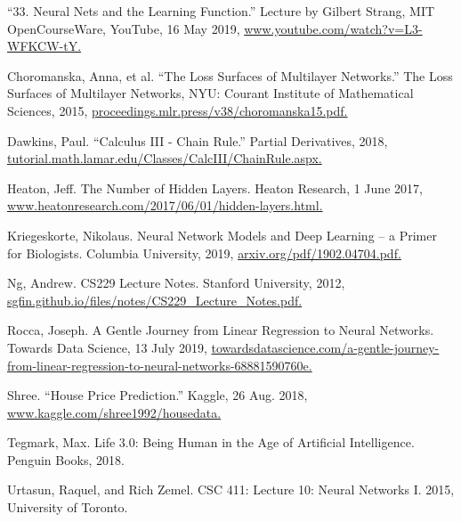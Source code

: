 \documentclass[12pt,a4paper]{article}
\begin{document}
\newpage

\begin{thebibliography}{99}


 “33. Neural Nets and the Learning Function.” Lecture by Gilbert Strang, MIT OpenCourseWare, YouTube, 16 May 2019,  \url{www.youtube.com/watch?v=L3-WFKCW-tY.}



 Choromanska, Anna, et al. “The Loss Surfaces of Multilayer Networks.” The Loss Surfaces of Multilayer Networks, NYU: Courant Institute of Mathematical Sciences, 2015,  \url{proceedings.mlr.press/v38/choromanska15.pdf.}



 Dawkins, Paul. “Calculus III - Chain Rule.” Partial Derivatives, 2018,  \url{tutorial.math.lamar.edu/Classes/CalcIII/ChainRule.aspx.}



 Heaton, Jeff. The Number of Hidden Layers. Heaton Research, 1 June 2017,  \url{www.heatonresearch.com/2017/06/01/hidden-layers.html.}



 Kriegeskorte, Nikolaus. Neural Network Models and Deep Learning – a Primer for Biologists. Columbia University, 2019,  \url{arxiv.org/pdf/1902.04704.pdf.}




 Ng, Andrew. CS229 Lecture Notes. Stanford University, 2012, \url{ sgfin.github.io/files/notes/CS229_Lecture_Notes.pdf.}



 Rocca, Joseph. A Gentle Journey from Linear Regression to Neural Networks. Towards Data Science, 13 July 2019, \url{ towardsdatascience.com/a-gentle-journey-from-linear-regression-to-neural-networks-68881590760e.}



 Shree. “House Price Prediction.” Kaggle, 26 Aug. 2018,  \url{www.kaggle.com/shree1992/housedata.}



 Tegmark, Max. Life 3.0: Being Human in the Age of Artificial Intelligence. Penguin Books, 2018.



 Urtasun, Raquel, and Rich Zemel. CSC 411: Lecture 10: Neural Networks I. 2015, University of Toronto.




\end{thebibliography}
\end{document}
